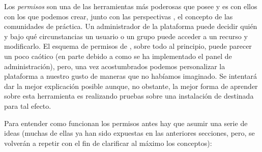Los \textit{permisos} son una de las herramientas más poderosas que posee \tiki{} y es con ellos con los que podemos crear, junto con las perspectivas , el concepto de las comunidades de práctica. Un administrador de la plataforma puede decidir quién y bajo qué circunstancias un usuario o un grupo puede acceder a un recurso y modificarlo. El esquema de permisos de \tiki{}, sobre todo al principio, puede parecer un poco caótico (en parte debido a como se ha implementado el panel de administración), pero, una vez acostumbrados podemos personalizar la plataforma a nuestro gusto de maneras que no habíamos imaginado. Se intentará dar la mejor explicación posible aunque, no obstante, la mejor forma de aprender sobre esta herramienta es realizando pruebas sobre una instalación de \tiki{} destinada para tal efecto.

Para entender como funcionan los permisos antes hay que asumir una serie de ideas (muchas de ellas ya han sido expuestas en las anteriores secciones, pero, se volverán a repetir con el fin de clarificar al máximo los conceptos):

